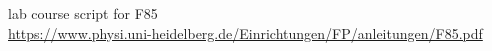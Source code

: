 \begin{thebibliography}{00}

     lab course script for F85 \\
    \url{https://www.physi.uni-heidelberg.de/Einrichtungen/FP/anleitungen/F85.pdf}

\end{thebibliography}
